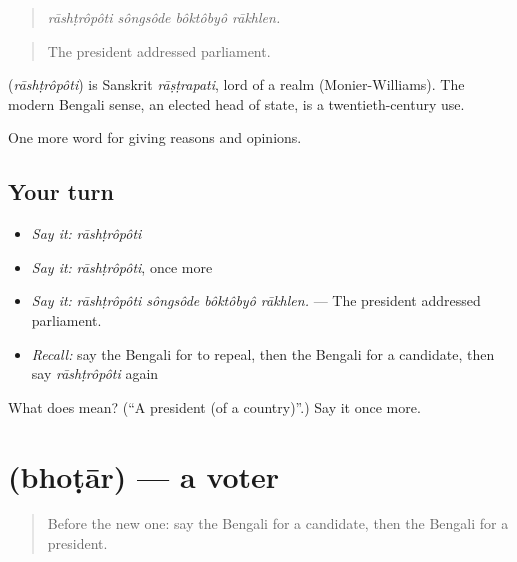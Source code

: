 \begin{quote}
\emph{rāshṭrôpôti sôngsôde bôktôbyô rākhlen.}
\end{quote}

\begin{quote}
The president addressed parliament.
\end{quote}

\begin{cousinweb}
\textbf{} (\emph{rāshṭrôpôti}) is Sanskrit \emph{rāṣṭrapati}, lord of a realm (Monier-Williams). The modern Bengali sense, an elected head of state, is a twentieth-century use.
\end{cousinweb}

\begin{grammarlens}[title={What you've built}]
One more word for giving reasons and opinions.
\end{grammarlens}

\subsection*{Your turn}
\begin{itemize}
\raggedright
  \item \emph{Say it:} \emph{rāshṭrôpôti}
  \item \emph{Say it:} \emph{rāshṭrôpôti}, once more
  \item \emph{Say it:} \emph{rāshṭrôpôti sôngsôde bôktôbyô rākhlen.} — The president addressed parliament.
  \item \emph{Recall:} say the Bengali for to repeal, then the Bengali for a candidate, then say \emph{rāshṭrôpôti} again
\end{itemize}

\begin{tcolorbox}[breakable,colback=teal!4,colframe=teal!35!black,title={Before you move on}]
What does  mean? (\textquotedblleft{}A president (of a country)\textquotedblright{}.) Say it once more.
\end{tcolorbox}
\section[\texorpdfstring{\bn{ভোটার} (bhoṭār)}{ভোটার (bhoṭār)}]{ (bhoṭār) — a voter}

\label{lesson:BN-C346-bhotar}



\begin{quote}
Before the new one: say the Bengali for a candidate, then the Bengali for a president.
\end{quote}

